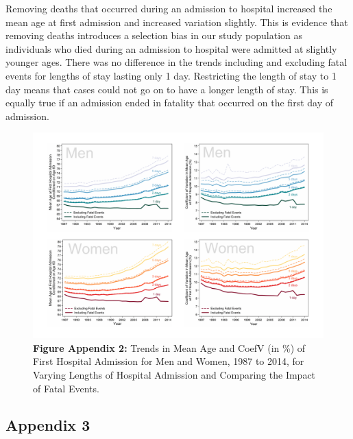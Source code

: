 Removing deaths that occurred during an admission to hospital increased the mean age 
at first admission and increased variation slightly. This is evidence that removing 
deaths introduces a selection bias in our study population as individuals who died 
during an admission to hospital were admitted at slightly younger ages. There was 
no difference in the trends including and excluding fatal events for lengths of stay 
lasting only 1 day. Restricting the length of stay to 1 day means that cases could 
not go on to have a longer length of stay. This is equally true if an admission ended 
in fatality that occurred on the first day of admission.


\begin{landscape}

	\begin{figure}[H]
		\centering
		\includegraphics[scale=0.65]{Paper_3/Appendix_2.pdf}
		\caption*{\textbf{Figure Appendix 2:} Trends in Mean Age and CoefV (in \%) of 
											First Hospital Admission for Men and Women, 
											1987 to 2014, for Varying Lengths of Hospital 
											Admission and Comparing the Impact of Fatal Events.}
	\end{figure}
	
\end{landscape}




\subsection{Appendix 3}

